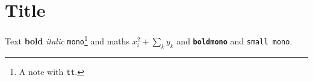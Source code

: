 \documentclass{article}
\begin{document}
\section{Title}
Text \textbf{bold} \textit{italic} \texttt{mono}\footnote{A note with \texttt{tt}.}
and maths $x^2_i + \sum_k y_k$ and \texttt{\textbf{boldmono}} and {\footnotesize \texttt{small mono}}.
\end{document}
